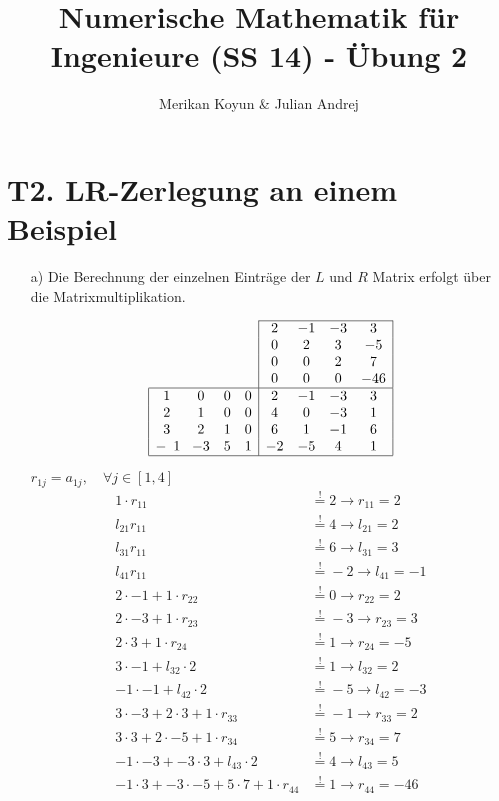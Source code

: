 \documentclass[11pt]{article}
\theoremstyle{plain}
\theoremstyle{definition}
\renewcommand{\a}{\"{a}}
\renewcommand{\u}{\"{u}}
\newcommand{\beequal}{\mathop{=}\limits^!}
\begin{document}
\title{Numerische Mathematik f\u r Ingenieure (SS 14) - \"{U}bung 2}
\author{Merikan Koyun \& Julian Andrej}
\maketitle

\section*{T2. LR-Zerlegung an einem Beispiel}
\begin{itemize}
\item[a)]
Die Berechnung der einzelnen Eintr\a ge der $L$ und $R$ Matrix erfolgt \u ber die Matrixmultiplikation.

\begin{align}
\begin{array}{cccc|cccc|}
\cline{5-8}
 &  &  &         & 2  & -1 & -3 & 3   \\
 &  &  &         & 0  &  2 &  3 & -5  \\ 
 &  &  &         & 0  &  0 &  2 &  7  \\
 &  &  &         & 0  &  0 &  0 & -46 \\ \hline
\multicolumn{1}{|c}  1 & 0 & 0 & 0     & 2  & -1 & -3 & 3 \\
\multicolumn{1}{|c}  2 & 1 & 0 & 0    & 4  & 0 & -3 & 1   \\
\multicolumn{1}{|c}  3 & 2 & 1 & 0    & 6  & 1 & -1 & 6   \\
\multicolumn{1}{|c} -1 & -3 & 5 & 1  & -2  & -5 & 4 & 1   \\ \hline
\end{array}
\end{align}

$r_{1j} = a_{1j}, \quad \forall j\in[1,4]$
\begin{align}
1 \cdot r_{11}  &\beequal 2 \rightarrow r_{11}=2  \\ 
l_{21} r_{11}  &\beequal 4  \rightarrow l_{21}=2  \\
l_{31} r_{11}  &\beequal 6  \rightarrow l_{31}=3  \\
l_{41} r_{11}  &\beequal -2 \rightarrow l_{41}=-1 \\
2 \cdot -1 + 1 \cdot r_{22} &\beequal 0 \rightarrow r_{22} = 2 \\
2 \cdot -3 + 1 \cdot r_{23} &\beequal -3 \rightarrow r_{23} = 3 \\
2 \cdot 3  + 1 \cdot r_{24} &\beequal 1  \rightarrow r_{24} = -5 \\
3 \cdot -1 + l_{32} \cdot 2 &\beequal 1  \rightarrow l_{32} = 2 \\
-1 \cdot -1 + l_{42} \cdot 2 &\beequal -5 \rightarrow l_{42} = -3 \\
3 \cdot -3 + 2 \cdot 3 + 1 \cdot r_{33} &\beequal -1 \rightarrow r_{33} = 2 \\
3 \cdot 3 + 2 \cdot -5 + 1 \cdot r_{34} &\beequal 5 \rightarrow r_{34} = 7 \\
-1 \cdot -3 + -3 \cdot 3 + l_{43} \cdot 2 &\beequal 4 \rightarrow l_{43} = 5 \\
-1 \cdot 3 + -3 \cdot -5 + 5 \cdot 7 + 1 \cdot r_{44} &\beequal 1 \rightarrow r_{44}=-46
\end{align}



\end{itemize}
\end{document}
